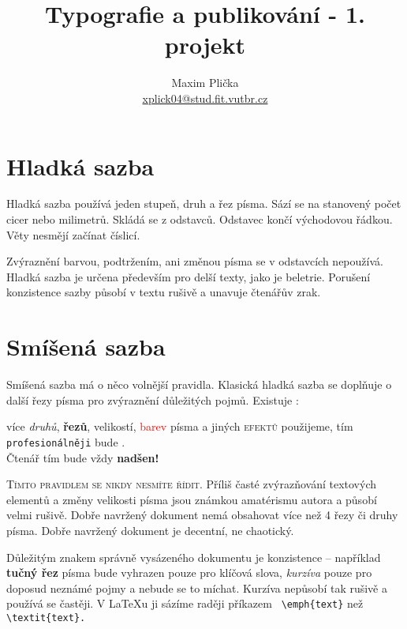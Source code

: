 \documentclass[a4paper,twocolumn,10pt]{article}
\title{Typografie a publikování - 1. projekt}
\author{Maxim Plička\\ \href{mailto:xplick04@stud.fit.vutbr.cz}{xplick04@stud.fit.vutbr.cz}}
\date{}
\begin{document}
\maketitle

\section{Hladká sazba}
Hladká sazba používá jeden stupeň, druh a řez písma. Sází
se na stanovený počet cicer nebo milimetrů. Skládá se z odstavců. Odstavec končí východovou řádkou. Věty nesmějí
začínat číslicí.
\par

Zvýraznění barvou, podtržením, ani změnou písma se
v odstavcích nepoužívá. Hladká sazba je určena především
pro delší texty, jako je beletrie. Porušení konzistence sazby
působí v textu rušivě a unavuje čtenářův zrak.

\section{Smíšená sazba}
Smíšená sazba má o něco volnější pravidla. Klasická hladká
sazba se doplňuje o další řezy písma pro zvýraznění důležitých pojmů. Existuje :
\par

\setlength{\parskip}{1em}
\begin{addmargin}{0.7cm}

 více \textit{druhů}, \textbf{řezů}, {\tiny velikostí},
\textcolor{red}{barev} písma a jiných \textsc{efektů} použijeme, tím \texttt{profesionálněji}
bude \Large {}\selectfont{dokument} \normalsize {}\selectfont{vypadat}.
\\\Huge{Č}\huge{t}\LARGE{e}\Large{n}\large{á}\normalsize{ř} \small{t}\footnotesize{í}\tiny{m} \normalsize{bude}
vždy {\Huge \bf nadšen!}
\par
\end{addmargin}

\textsc{Tímto pravidlem se nikdy nesmíte řídit}. Příliš
časté zvýrazňování textových elementů a změny velikosti
písma jsou známkou amatérismu autora a působí velmi rušivě. Dobře navržený dokument nemá obsahovat více než
4 řezy či druhy písma. Dobře navržený dokument je decentní, ne chaotický.
\par
\setlength{\parskip}{0em}

Důležitým znakem správně vysázeného dokumentu je konzistence -- například \textbf{tučný řez} písma bude vyhrazen
pouze pro klíčová slova, \emph{kurzíva} pouze pro doposud neznámé pojmy a nebude se to míchat. Kurzíva nepůsobí
tak rušivě a používá se častěji. V \LaTeX u ji sázíme raději
příkazem \verb! \emph{text}! než \verb! \textit{text}.!
\par
\end{document}
